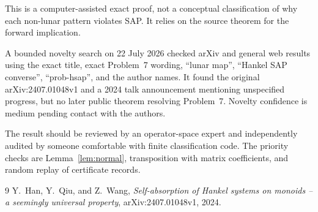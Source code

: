 \documentclass[11pt]{article}
\begin{document}
This is a computer-assisted exact proof, not a conceptual classification of
why each non-lunar pattern violates SAP.  It relies on the source theorem for
the forward implication.

A bounded novelty search on 22 July 2026 checked arXiv and general web results
using the exact title, exact Problem~7 wording, ``lunar map'', ``Hankel SAP
converse'', ``prob-hsap'', and the author names.  It found the original
arXiv:2407.01048v1 and a 2024 talk announcement mentioning unspecified
progress, but no later public theorem resolving Problem~7.  Novelty confidence
is medium pending contact with the authors.

The result should be reviewed by an operator-space expert and independently
audited by someone comfortable with finite classification code.  The priority
checks are Lemma~\ref{lem:normal}, transposition with matrix coefficients, and
random replay of certificate records.

\begin{thebibliography}{9}
Y.~Han, Y.~Qiu, and Z.~Wang,
\emph{Self-absorption of Hankel systems on monoids -- a seemingly universal
property}, arXiv:2407.01048v1, 2024.
\end{thebibliography}
\end{document}
